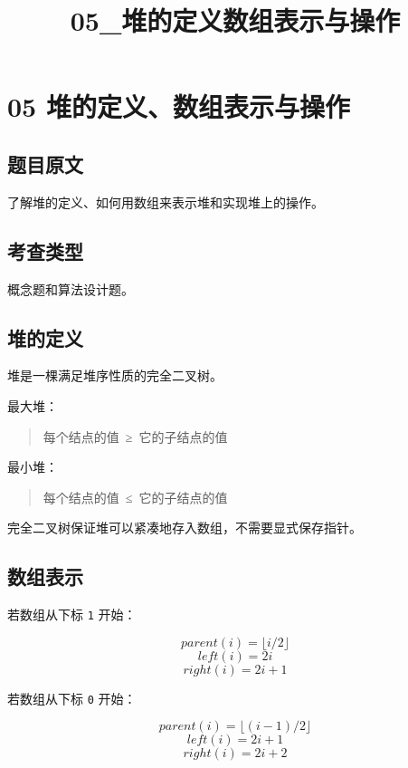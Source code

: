 \documentclass[UTF8,zihao=-4]{ctexart}
\title{05\_堆的定义数组表示与操作}
\author{}
\date{}
\begin{document}
\maketitle

\section*{05 堆的定义、数组表示与操作}

\subsection*{题目原文}

了解堆的定义、如何用数组来表示堆和实现堆上的操作。

\subsection*{考查类型}

概念题和算法设计题。

\subsection*{堆的定义}

堆是一棵满足堆序性质的完全二叉树。

最大堆：

\begin{quote}
\small\ttfamily\raggedright
\relax 每个结点的值\ ≥\ 它的子结点的值\\
\end{quote}

最小堆：

\begin{quote}
\small\ttfamily\raggedright
\relax 每个结点的值\ ≤\ 它的子结点的值\\
\end{quote}

完全二叉树保证堆可以紧凑地存入数组，不需要显式保存指针。

\subsection*{数组表示}

若数组从下标 \texttt{1} 开始：

\[parent(i) = \lfloor i / 2 \rfloor\]
\[left(i) = 2i\]
\[right(i) = 2i + 1\]

若数组从下标 \texttt{0} 开始：

\[parent(i) = \lfloor (i - 1) / 2 \rfloor\]
\[left(i) = 2i + 1\]
\[right(i) = 2i + 2\]
\end{document}

